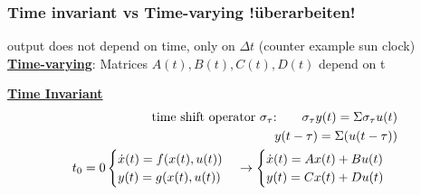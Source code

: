     \subsubsection*{Time invariant vs Time-varying !überarbeiten!}
        output does not depend on time, only on $\Delta t$ (counter example sun clock)\\
        {\centering\textbf{\underline{Time-varying}}}: Matrices $A(t), B(t), C(t), D(t)$ depend on t

        {\centering\textbf{\underline{Time Invariant}}}
        \begin{align*}
            \text{time shift operator $\sigma_{\tau}$:\quad \quad} \sigma_{\tau} y(t) = \Sigma \sigma_{\tau} u(t)\\
            y(t - \tau) = \Sigma(u(t - \tau))\\
            t_0 = 0
            \begin{cases}
                \dot{x}(t) = f(x(t), u(t))\\
                y(t) = g(x(t), u(t))
            \end{cases}
            \rightarrow
            \begin{cases}
                \dot{x}(t) = Ax(t) + Bu(t)\\
                y(t) = Cx(t) + Du(t)
            \end{cases}
        \end{align*}